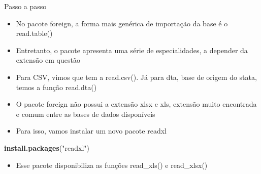 \documentclass[
  10pt,
  ignorenonframetext,
]{beamer}
\newenvironment{Shaded}{\begin{snugshade}}{\end{snugshade}}
\newcommand{\KeywordTok}[1]{\textcolor[rgb]{0.13,0.29,0.53}{\textbf{#1}}}
\newcommand{\NormalTok}[1]{#1}
\newcommand{\StringTok}[1]{\textcolor[rgb]{0.31,0.60,0.02}{#1}}
\providecommand{\tightlist}{%
  \setlength{\itemsep}{0pt}\setlength{\parskip}{0pt}}
\begin{document}
\begin{frame}[fragile]{Passo a passo}
\protect\hypertarget{passo-a-passo-2}{}
\begin{itemize}
\tightlist
\item
  No pacote foreign, a forma mais genérica de importação da base é o
  read.table()
\item
  Entretanto, o pacote apresenta uma série de especialidades, a depender
  da extensão em questão
\item
  Para CSV, vimos que tem a read.csv(). Já para dta, base de origem do
  stata, temos a função read.dta()
\item
  O pacote foreign não possui a extensão xlsx e xls, extensão muito
  encontrada e comum entre as bases de dados disponíveis
\item
  Para isso, vamos instalar um novo pacote readxl
\end{itemize}

\begin{Shaded}
\begin{Highlighting}[]
\KeywordTok{install.packages}\NormalTok{(}\StringTok{"readxl"}\NormalTok{)}
\end{Highlighting}
\end{Shaded}

\begin{itemize}
\tightlist
\item
  Esse pacote disponibiliza as funções read\_xls() e read\_xlsx()
\end{itemize}
\end{frame}
\end{document}
